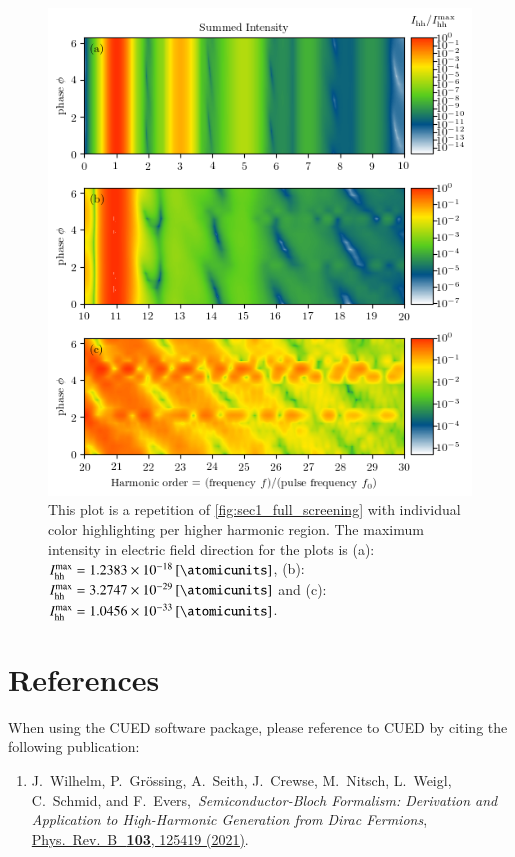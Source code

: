 \documentclass[11pt, a4paper]{scrartcl}
\newcommand{\paper}[4]{\item #1, \,\textit{#2}, \,\href{#3}{#4}.\\[-1.4em]}
\begin{document}
\begin{figure}[H]
    \centering
    \includegraphics[width=\textwidth]{phase=variable_full_split_plot.png}
    \caption{This plot is a repetition of \cref{fig:sec1_full_screening} with individual color
      highlighting per higher harmonic region. The maximum intensity in electric
      field direction for the plots is (a): $I_{\mathrm{hh}}^{\mathrm{max}} = \SI{1.2383e-18}{[\atomicunits]}$, 
      (b): $I_{\mathrm{hh}}^{\mathrm{max}} = \SI{3.2747e-29}{[\atomicunits]}$ and (c): 
      $I_{\mathrm{hh}}^{\mathrm{max}} = \SI{1.0456e-33}{[\atomicunits]}$.}
    \label{fig:sec1_full_screening_s}
\end{figure}

\section{References}
When using the CUED software package, please reference to CUED by citing the following publication:
\begin{enumerate}[leftmargin=*]

\paper{J.~Wilhelm, P.~Grössing, A.~Seith, J.~Crewse, M.~Nitsch, L.~Weigl, C.~Schmid, and F.~Evers}{Semi\-con\-duc\-tor-Bloch Formalism: Derivation and Application to High-Harmonic Generation from Dirac Fermions}{https://doi.org/10.1103/PhysRevB.103.125419}{ 
Phys.~Rev.~B~\,\textbf{103}, 125419 (2021)}
\label{Wilhelm2021}

\end{enumerate}
\end{document}
